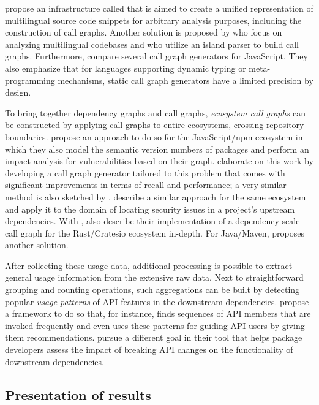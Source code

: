 \citet{collard2013srcml} propose an infrastructure called  that is aimed to create a unified representation of multilingual source code snippets for arbitrary analysis purposes, including the construction of call graphs.
Another solution is proposed by \citet{bogar2018lightweight} who focus on analyzing multilingual codebases and who utilize an island parser to build call graphs.
Furthermore, \citet{antal2018static} compare several call graph generators for JavaScript.
They also emphasize that for languages supporting dynamic typing or meta-programming mechanisms, static call graph generators have a limited precision by design.

To bring together dependency graphs and call graphs, \emph{ecosystem call graphs} can be constructed by applying call graphs to entire ecosystems, crossing repository boundaries.
\citet{hejderup2018software} propose an approach to do so for the JavaScript/npm ecosystem in which they also model the semantic version numbers of packages and perform an impact analysis for vulnerabilities based on their graph.
\citet{nielsen2021modular} elaborate on this work by developing a call graph generator tailored to this problem that comes with significant improvements in terms of recall and performance; a very similar method is also sketched by \citet{boldi2020fine}.
\citet{wang2020empirical} describe a similar approach for the same ecosystem and apply it to the domain of locating security issues in a project's upstream dependencies.
With , \citet{hejderup2021präzi} also describe their implementation of a dependency-scale call graph for the Rust/Cratesio ecosystem in-depth.
For Java/Maven, \citet{keshani2021scalable} proposes another solution.

After collecting these usage data, additional processing is possible to extract general usage information from the extensive raw data.
Next to straightforward grouping and counting operations, such aggregations can be built by detecting popular \emph{usage patterns} of API features in the downstream dependencies.
\citet{zhong2009mapo} propose a framework to do so that, for instance, finds sequences of API members that are invoked frequently and even uses these patterns for guiding API users by giving them recommendations.
\citet{hanam2019aiding} pursue a different goal in their tool that helps package developers assess the impact of breaking API changes on the functionality of downstream dependencies.

\subsection{Presentation of results}
\label{sec:related_work/presentation}

